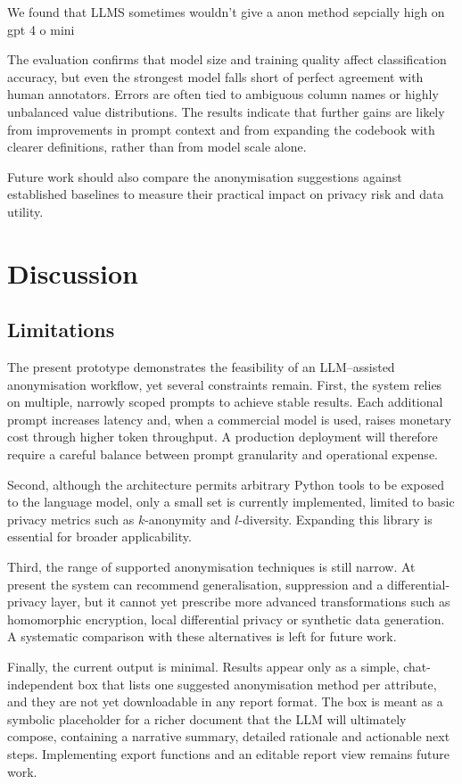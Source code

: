 \documentclass{article}
\begin{document}
We found that LLMS sometimes wouldn't give a anon method sepcially high on gpt 4 o mini

The evaluation confirms that model size and training quality affect classification accuracy, but even the strongest model falls short of perfect agreement with human annotators.  
Errors are often tied to ambiguous column names or highly unbalanced value distributions.  
The results indicate that further gains are likely from improvements in prompt context and from expanding the codebook with clearer definitions, rather than from model scale alone.

Future work should also compare the anonymisation suggestions against established baselines to measure their practical impact on privacy risk and data utility.

\newpage

\section{Discussion}
\subsection{Limitations}
\label{sec:limitations}

The present prototype demonstrates the feasibility of an LLM–assisted anonymisation workflow, yet several constraints remain.  
First, the system relies on multiple, narrowly scoped prompts to achieve stable results.  Each additional prompt increases latency and, when a commercial model is used, raises monetary cost through higher token throughput.  A production deployment will therefore require a careful balance between prompt granularity and operational expense.  

Second, although the architecture permits arbitrary Python tools to be exposed to the language model, only a small set is currently implemented, limited to basic privacy metrics such as $k$-anonymity and $l$-diversity.  Expanding this library is essential for broader applicability.  

Third, the range of supported anonymisation techniques is still narrow.  At present the system can recommend generalisation, suppression and a differential-privacy layer, but it cannot yet prescribe more advanced transformations such as homomorphic encryption, local differential privacy or synthetic data generation.  A systematic comparison with these alternatives is left for future work.  

Finally, the current output is minimal.  Results appear only as a simple, chat-independent box that lists one suggested anonymisation method per attribute, and they are not yet downloadable in any report format.  The box is meant as a symbolic placeholder for a richer document that the LLM will ultimately compose, containing a narrative summary, detailed rationale and actionable next steps.  Implementing export functions and an editable report view remains future work.
\end{document}
